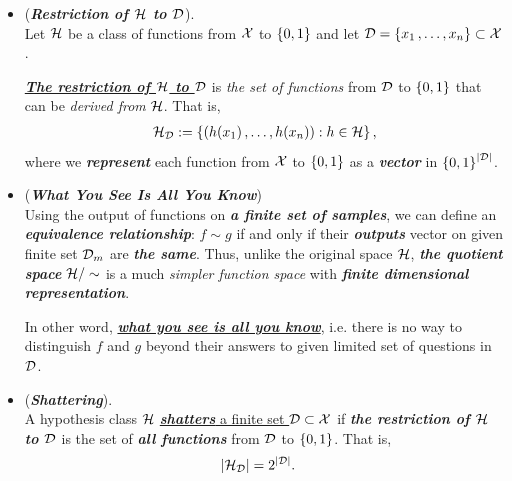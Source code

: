 \documentclass[11pt]{article}
\begin{document}
\begin{itemize}
\item \begin{definition} (\emph{\textbf{Restriction of ${\mathcal H}$ to ${\mathcal D}$}}). \\
Let ${\mathcal H}$ be a class of functions from ${\mathcal X}$ to $\left\{0,1\right\}$ and let ${\mathcal D} = \left\{x_1 \,{,}\ldots{,}\, x_n\right\} \subset {\mathcal X}$. 

\underline{\emph{\textbf{The restriction of ${\mathcal H}$ to ${\mathcal D}$}}} is \emph{the set of functions} from ${\mathcal D}$ to $\left\{0,1\right\}$ that can be \emph{derived from} ${\mathcal H}$. That is,
\begin{align*}
{\mathcal H}_{{\mathcal D}} := \left\{(h(x_1) \,{,}\ldots{,}\, h(x_n)): h \in {\mathcal H}\right\},
\end{align*}
where we \emph{\textbf{represent}} each function from ${\mathcal X}$ to $\left\{0,1\right\}$ as a \emph{\textbf{vector}} in $\left\{0,1\right\}^{\left\lvert {\mathcal D} \right\rvert}$.
\end{definition}

\item \begin{remark} (\textbf{\emph{What You See Is All You Know}})\\
Using the output of functions on \emph{\textbf{a finite set of samples}}, we can define an \emph{\textbf{equivalence relationship}}: $f \sim g$ if and only if their \emph{\textbf{outputs}} vector on given finite set ${\mathcal D}_m$ are \emph{\textbf{the same}}. Thus, unlike the original space ${\mathcal H}$, \emph{\textbf{the quotient space}} ${\mathcal H}/\sim$ is a much \emph{simpler function space} with \emph{\textbf{finite dimensional representation}}. 

In other word, \underline{\emph{\textbf{what you see is all you know}}}, i.e. there is no way to distinguish $f$ and $g$ beyond their answers to given limited set of questions in ${\mathcal D}$.

\end{remark}

\item \begin{definition}(\emph{\textbf{Shattering}}). \\
A hypothesis class ${\mathcal H}$ \underline{\emph{\textbf{shatters}} a finite set ${\mathcal D} \subset {\mathcal X}$} if \emph{\textbf{the restriction of ${\mathcal H}$ to ${\mathcal D}$}} is the set of \emph{\textbf{all functions}} from ${\mathcal D}$ to $\left\{0,1\right\}$. That is, 
\begin{align*}
\left\lvert {\mathcal H}_{{\mathcal D}} \right\rvert &= 2^{\left\lvert {\mathcal D} \right\rvert}.
\end{align*}
\end{definition}


\end{itemize}
\end{document}
